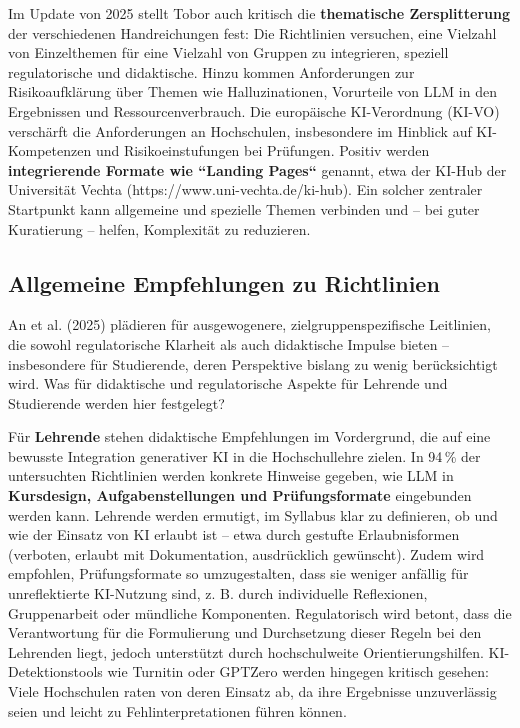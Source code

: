 \documentclass[
  ngerman,
  letterpaper,
  DIV=11]{scrreprt}
\begin{document}
Im Update von 2025 stellt Tobor auch kritisch die \textbf{thematische
Zersplitterung} der verschiedenen Handreichungen fest: Die Richtlinien
versuchen, eine Vielzahl von Einzelthemen für eine Vielzahl von Gruppen
zu integrieren, speziell regulatorische und didaktische. Hinzu kommen
Anforderungen zur Risikoaufklärung über Themen wie Halluzinationen,
Vorurteile von LLM in den Ergebnissen und Ressourcenverbrauch. Die
europäische KI-Verordnung (KI-VO) verschärft die Anforderungen an
Hochschulen, insbesondere im Hinblick auf KI-Kompetenzen und
Risikoeinstufungen bei Prüfungen. Positiv werden \textbf{integrierende
Formate wie ``Landing Pages``} genannt, etwa der KI-Hub der Universität
Vechta (https://www.uni-vechta.de/ki-hub). Ein solcher zentraler
Startpunkt kann allgemeine und spezielle Themen verbinden und -- bei
guter Kuratierung -- helfen, Komplexität zu reduzieren.

\subsection{Allgemeine Empfehlungen zu
Richtlinien}\label{allgemeine-empfehlungen-zu-richtlinien}

An et al. (2025) plädieren für ausgewogenere, zielgruppenspezifische
Leitlinien, die sowohl regulatorische Klarheit als auch didaktische
Impulse bieten -- insbesondere für Studierende, deren Perspektive
bislang zu wenig berücksichtigt wird. Was für didaktische und
regulatorische Aspekte für Lehrende und Studierende werden hier
festgelegt?

Für \textbf{Lehrende} stehen didaktische Empfehlungen im Vordergrund,
die auf eine bewusste Integration generativer KI in die Hochschullehre
zielen. In 94\,\% der untersuchten Richtlinien werden konkrete Hinweise
gegeben, wie LLM in \textbf{Kursdesign, Aufgabenstellungen und
Prüfungsformate} eingebunden werden kann. Lehrende werden ermutigt, im
Syllabus klar zu definieren, ob und wie der Einsatz von KI erlaubt ist
-- etwa durch gestufte Erlaubnisformen (verboten, erlaubt mit
Dokumentation, ausdrücklich gewünscht). Zudem wird empfohlen,
Prüfungsformate so umzugestalten, dass sie weniger anfällig für
unreflektierte KI-Nutzung sind, z. B. durch individuelle Reflexionen,
Gruppenarbeit oder mündliche Komponenten. Regulatorisch wird betont,
dass die Verantwortung für die Formulierung und Durchsetzung dieser
Regeln bei den Lehrenden liegt, jedoch unterstützt durch hochschulweite
Orientierungshilfen. KI-Detektionstools wie Turnitin oder GPTZero werden
hingegen kritisch gesehen: Viele Hochschulen raten von deren Einsatz ab,
da ihre Ergebnisse unzuverlässig seien und leicht zu
Fehlinterpretationen führen können.
\end{document}
